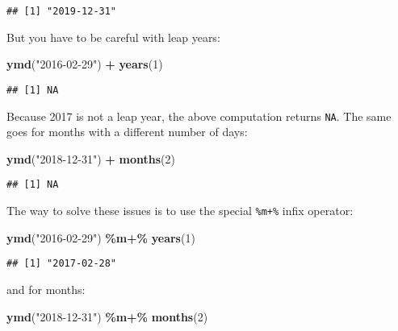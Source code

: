 \documentclass[
]{article}
\newenvironment{Shaded}{\begin{snugshade}}{\end{snugshade}}
\newcommand{\DecValTok}[1]{\textcolor[rgb]{0.00,0.00,0.81}{#1}}
\newcommand{\KeywordTok}[1]{\textcolor[rgb]{0.13,0.29,0.53}{\textbf{#1}}}
\newcommand{\NormalTok}[1]{#1}
\newcommand{\OperatorTok}[1]{\textcolor[rgb]{0.81,0.36,0.00}{\textbf{#1}}}
\newcommand{\StringTok}[1]{\textcolor[rgb]{0.31,0.60,0.02}{#1}}
\begin{document}
\begin{verbatim}
## [1] "2019-12-31"
\end{verbatim}

But you have to be careful with leap years:

\begin{Shaded}
\begin{Highlighting}[]
\KeywordTok{ymd}\NormalTok{(}\StringTok{"2016{-}02{-}29"}\NormalTok{) }\OperatorTok{+}\StringTok{ }\KeywordTok{years}\NormalTok{(}\DecValTok{1}\NormalTok{)}
\end{Highlighting}
\end{Shaded}

\begin{verbatim}
## [1] NA
\end{verbatim}

Because 2017 is not a leap year, the above computation returns \texttt{NA}. The same goes for months with
a different number of days:

\begin{Shaded}
\begin{Highlighting}[]
\KeywordTok{ymd}\NormalTok{(}\StringTok{"2018{-}12{-}31"}\NormalTok{) }\OperatorTok{+}\StringTok{ }\KeywordTok{months}\NormalTok{(}\DecValTok{2}\NormalTok{)}
\end{Highlighting}
\end{Shaded}

\begin{verbatim}
## [1] NA
\end{verbatim}

The way to solve these issues is to use the special \texttt{\%m+\%} infix operator:

\begin{Shaded}
\begin{Highlighting}[]
\KeywordTok{ymd}\NormalTok{(}\StringTok{"2016{-}02{-}29"}\NormalTok{) }\OperatorTok{\%m+\%}\StringTok{ }\KeywordTok{years}\NormalTok{(}\DecValTok{1}\NormalTok{)}
\end{Highlighting}
\end{Shaded}

\begin{verbatim}
## [1] "2017-02-28"
\end{verbatim}

and for months:

\begin{Shaded}
\begin{Highlighting}[]
\KeywordTok{ymd}\NormalTok{(}\StringTok{"2018{-}12{-}31"}\NormalTok{) }\OperatorTok{\%m+\%}\StringTok{ }\KeywordTok{months}\NormalTok{(}\DecValTok{2}\NormalTok{)}
\end{Highlighting}
\end{Shaded}
\end{document}
